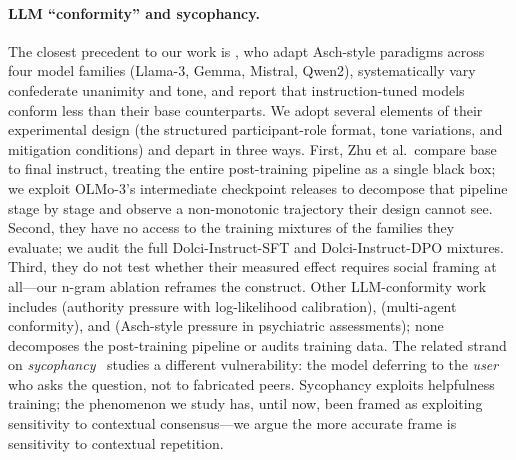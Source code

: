 \documentclass[11pt]{article}
\begin{document}
\paragraph{LLM ``conformity'' and sycophancy.}
The closest precedent to our work is \citet{zhu2025conformity}, who adapt Asch-style paradigms across four model families (Llama-3, Gemma, Mistral, Qwen2), systematically vary confederate unanimity and tone, and report that instruction-tuned models conform less than their base counterparts. We adopt several elements of their experimental design (the structured participant-role format, tone variations, and mitigation conditions) and depart in three ways. First, Zhu et al.\ compare base to final instruct, treating the entire post-training pipeline as a single black box; we exploit OLMo-3's intermediate checkpoint releases to decompose that pipeline stage by stage and observe a non-monotonic trajectory their design cannot see. Second, they have no access to the training mixtures of the families they evaluate; we audit the full Dolci-Instruct-SFT and Dolci-Instruct-DPO mixtures. Third, they do not test whether their measured effect requires social framing at all---our n-gram ablation reframes the construct. Other LLM-conformity work includes \citet{celebi2025parrot} (authority pressure with log-likelihood calibration), \citet{weng2025benchform} (multi-agent conformity), and \citet{shoval2025psychiatric} (Asch-style pressure in psychiatric assessments); none decomposes the post-training pipeline or audits training data. The related strand on \emph{sycophancy}~\citep{sharma2024sycophancy, elephant2025, hong2025syconbench} studies a different vulnerability: the model deferring to the \emph{user} who asks the question, not to fabricated peers. Sycophancy exploits helpfulness training; the phenomenon we study has, until now, been framed as exploiting sensitivity to contextual consensus---we argue the more accurate frame is sensitivity to contextual repetition.
\end{document}
